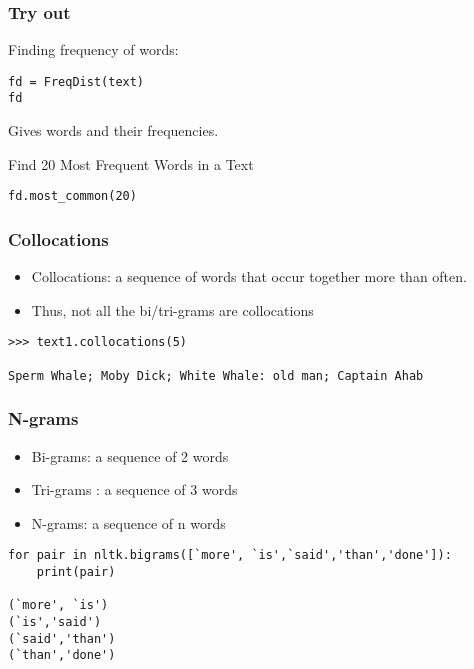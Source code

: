 \begin{frame}[fragile]\frametitle{Try out}
  Finding frequency of words:

  \begin{lstlisting}
fd = FreqDist(text)
fd
\end{lstlisting}

Gives words and their frequencies.

Find 20 Most Frequent Words in a Text

  \begin{lstlisting}
fd.most_common(20)
\end{lstlisting}




\end{frame}



\begin{frame}[fragile]\frametitle{Collocations}
\begin{itemize}
\item Collocations: a sequence of words that occur together more than often.
\item Thus, not all the bi/tri-grams are collocations
\end{itemize}
{\small
\begin{lstlisting}
>>> text1.collocations(5)

Sperm Whale; Moby Dick; White Whale: old man; Captain Ahab
\end{lstlisting}}
\end{frame}

\begin{frame}[fragile]\frametitle{N-grams}
\begin{itemize}
\item Bi-grams: a sequence of 2 words
\item Tri-grams : a sequence of 3 words
\item N-grams: a sequence of n words
\end{itemize}
{\small
\begin{lstlisting}
for pair in nltk.bigrams([`more', `is',`said','than','done']):
	print(pair)
	
(`more', `is')
(`is','said')
(`said','than')
(`than','done')
\end{lstlisting}}
\end{frame}


